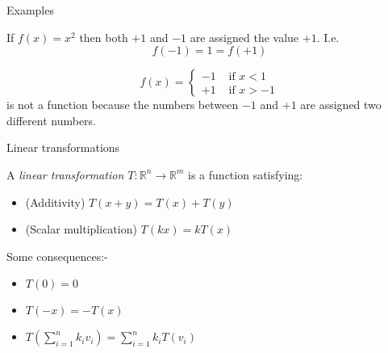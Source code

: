 \documentclass{beamer}
\begin{document}
\begin{frame}{Examples}
\begin{example}
If $f(x) = x^2$ then both $+1$ and $-1$ are assigned the value $+1$. I.e.
\begin{equation*}
f(-1) = 1 = f(+1)
\end{equation*}
\end{example}
\begin{example}
\begin{equation*}
f(x) = \begin{cases}
	-1 & \text{ if }x<1\\
	+1 & \text{ if }x>-1
\end{cases}
\end{equation*}
is not a function because the numbers between $-1$ and $+1$ are assigned two different numbers.
\end{example}
\end{frame}

\begin{frame}{Linear transformations}
\begin{definition}
A \emph{linear transformation $T:\mathbb{R}^n \rightarrow \mathbb{R}^m$} is a function satisfying:
\begin{itemize}
	\item (Additivity) $T(x+y) = T(x) + T(y)$
	\item (Scalar multiplication) $T(kx) = kT(x)$
\end{itemize}
\end{definition}
Some consequences:-
\begin{itemize}
	\item $T(0) = 0$
	\item $T(-x) = -T(x)$
	\item $T\left(\sum_{i=1}^n k_i v_i\right) = \sum_{i=1}^n k_i T(v_i)$
\end{itemize}
\end{frame}
\end{document}

